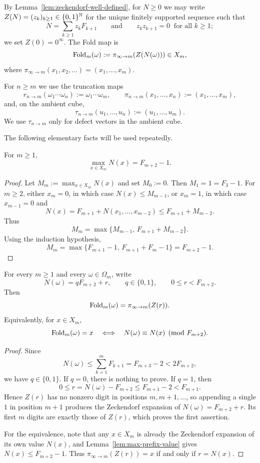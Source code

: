 By Lemma~\ref{lem:zeckendorf-well-defined}, for $N\ge 0$ we may write
$Z(N)=(z_k)_{k\ge 1}\in\{0,1\}^{\mathbb{N}}$ for the unique finitely supported
sequence such that
\[
N=\sum_{k\ge 1}z_kF_{k+1}
\qquad\text{and}\qquad
z_kz_{k+1}=0\ \text{ for all }k\ge 1;
\]
we set $Z(0)=0^\infty$.  The Fold map is
\[
\operatorname{Fold}_m(\omega):=\pi_{\infty\to m}(Z(N(\omega)))\in X_m,
\]
where $\pi_{\infty\to m}(x_1,x_2,\dots)=(x_1,\dots,x_m)$.

For $n\ge m$ we use the truncation maps
\[
r_{n\to m}(\omega_1\cdots\omega_n):=\omega_1\cdots\omega_m,
\qquad
\pi_{n\to m}(x_1,\dots,x_n):=(x_1,\dots,x_m),
\]
and, on the ambient cube,
\[
\tau_{n\to m}(u_1,\dots,u_n):=(u_1,\dots,u_m).
\]
We use $\tau_{n\to m}$ only for defect vectors in the ambient cube.

The following elementary facts will be used repeatedly.

\begin{lemma}
\label{lem:max-prefix-value}
For $m\ge 1$,
\[
\max_{x\in X_m}N(x)=F_{m+2}-1.
\]
\end{lemma}

\begin{proof}
Let $M_m:=\max_{x\in X_m}N(x)$ and set $M_0:=0$.  Then $M_1=1=F_3-1$.  For
$m\ge 2$, either $x_m=0$, in which case $N(x)\le M_{m-1}$, or $x_m=1$, in
which case $x_{m-1}=0$ and
\[
N(x)=F_{m+1}+N(x_1,\dots,x_{m-2})\le F_{m+1}+M_{m-2}.
\]
Thus
\[
M_m=\max\{M_{m-1},\,F_{m+1}+M_{m-2}\}.
\]
Using the induction hypothesis,
\[
M_m=\max\{F_{m+1}-1,\,F_{m+1}+F_m-1\}=F_{m+2}-1.
\]
\end{proof}

\begin{proposition}
\label{prop:fold-residue}
For every $m\ge 1$ and every $\omega\in\Omega_m$, write
\[
N(\omega)=qF_{m+2}+r,
\qquad
q\in\{0,1\},
\qquad
0\le r<F_{m+2}.
\]
Then
\[
\operatorname{Fold}_m(\omega)=\pi_{\infty\to m}(Z(r)).
\]
Equivalently, for $x\in X_m$,
\[
\operatorname{Fold}_m(\omega)=x
\quad\Longleftrightarrow\quad
N(\omega)\equiv N(x)\pmod{F_{m+2}}.
\]
\end{proposition}

\begin{proof}
Since
\[
N(\omega)\le \sum_{k=1}^mF_{k+1}=F_{m+3}-2<2F_{m+2},
\]
we have $q\in\{0,1\}$.  If $q=0$, there is nothing to prove.  If $q=1$, then
\[
0\le r=N(\omega)-F_{m+2}\le F_{m+1}-2<F_{m+1}.
\]
Hence $Z(r)$ has no nonzero digit in positions $m,m+1,\dots$, so appending a
single $1$ in position $m+1$ produces the Zeckendorf expansion of
$N(\omega)=F_{m+2}+r$.  Its first $m$ digits are exactly those of $Z(r)$,
which proves the first assertion.

For the equivalence, note that any $x\in X_m$ is already the Zeckendorf
expansion of its own value $N(x)$, and Lemma~\ref{lem:max-prefix-value} gives
$N(x)\le F_{m+2}-1$.  Thus $\pi_{\infty\to m}(Z(r))=x$ if and only if
$r=N(x)$.
\end{proof}

